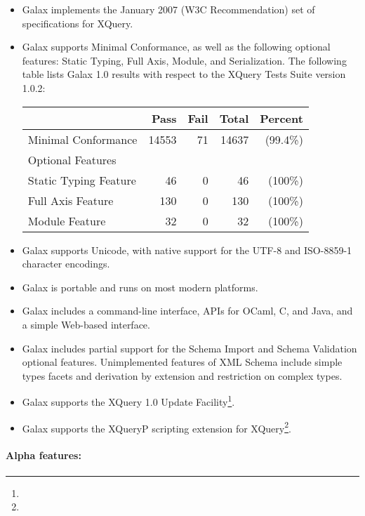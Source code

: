 \begin{itemize}
\item Galax implements the January 2007 (W3C Recommendation)
  set of specifications for XQuery.
\item Galax supports Minimal Conformance, as well as the following
  optional features: Static Typing, Full Axis, Module, and
  Serialization. The following table lists Galax 1.0 results with
  respect to the XQuery Tests Suite version 1.0.2:
\begin{center}
\begin{tabular}{|lrrrr|}
  \hline
  & Pass & Fail & Total & Percent\\\hline
  Minimal Conformance      &       14553 & 71 & 14637 & (99.4\%)\\\hline
  Optional Features &&&& \\
  \hspace*{0.5cm}Static Typing Feature   &      46    & 0   & 46 & (100\%)\\
  \hspace*{0.5cm}Full Axis Feature        &     130  & 0   & 130 & (100\%)\\
  \hspace*{0.5cm}Module Feature            &    32    & 0   & 32 & (100\%)\\\hline
\end{tabular}
\end{center}
\item Galax supports Unicode, with native support for the UTF-8 and
  ISO-8859-1 character encodings.
\item Galax is portable and runs on most modern platforms.
\item Galax includes a command-line interface, APIs for OCaml, C, and
  Java, and a simple Web-based interface.
\item Galax includes partial support for the Schema Import and Schema
  Validation optional features. Unimplemented features of XML Schema
  include simple types facets and derivation by extension and
  restriction on complex types.
\item Galax supports the XQuery 1.0 Update
Facility\footnote{\ultfurl}.
\item Galax supports the XQueryP scripting extension for
  XQuery\footnote{\xqueryp}.
\end{itemize}

\paragraph{Alpha features:}

